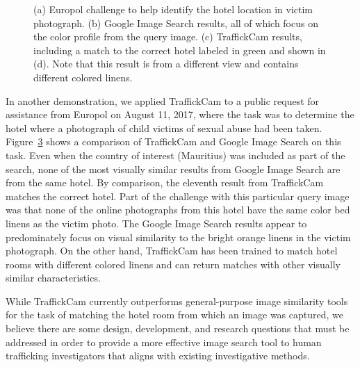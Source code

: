 \documentclass[12pt]{article}
\begin{document}
\begin{figure}
\begin{subfigure}[b]{3.1in}
        \caption{}
        \label{fig:europolTcam}
    \end{subfigure}
    \unskip \hspace{0pt}
    \begin{subfigure}[b]{3.1in}
        \caption{}
        \label{fig:europolCorrectResult}
    \end{subfigure}
    \caption[Example results on Europol image challenge]{(a) Europol challenge to help identify the hotel location in victim photograph. (b) Google Image Search results, all of which focus on the color profile from the query image. (c) TraffickCam results, including a match to the correct hotel labeled in green and shown in (d). Note that this result is from a different view and contains different colored linens.}
    \label{fig:europol}
\end{figure}

In another demonstration, we applied TraffickCam to a public request for assistance from Europol on August 11, 2017, where the task was to determine the hotel where a photograph of child victims of sexual abuse had been taken. Figure~\ref{fig:europol} shows a comparison of TraffickCam and Google Image Search on this task. Even when the country of interest (Mauritius) was included as part of the search, none of the most visually similar results from Google Image Search are from the same hotel. By comparison, the eleventh result from TraffickCam matches the correct hotel. Part of the challenge with this particular query image was that none of the online photographs from this hotel have the same color bed linens as the victim photo. The Google Image Search results appear to predominately focus on visual similarity to the bright orange linens in the victim photograph. On the other hand, TraffickCam has been trained to match hotel rooms with different colored linens and can return matches with other visually similar characteristics. 

While TraffickCam currently outperforms general-purpose image similarity tools for the task of matching the hotel room from which an image was captured, we believe there are some design, development, and research questions that must be addressed in order to provide a more effective image search tool to human trafficking investigators that aligns with existing investigative methods.
\end{document}
